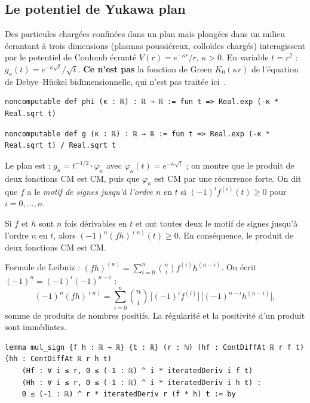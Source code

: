 \subsection{Le potentiel de Yukawa plan}\label{ch2:ssec:yuk}

\begin{physbox}
Des particules chargées confinées dans un plan mais plongées dans un milieu écrantant à trois dimensions (plasmas
poussiéreux, colloïdes chargés) interagissent par le potentiel de Coulomb écranté $V(r)=e^{-\kappa r}/r$, $\kappa>0$.
En variable $t=r^2$ : $g_\kappa(t)=e^{-\kappa\sqrt t}/\sqrt t$. \textbf{Ce n'est pas} la fonction de Green
$K_0(\kappa r)$ de l'équation de Debye--Hückel bidimensionnelle, qui n'est pas traitée ici~\cite{ch2yuk}.
\end{physbox}
\begin{leanbox}
\begin{lstlisting}[style=chdeux]
noncomputable def phi (κ : ℝ) : ℝ → ℝ := fun t => Real.exp (-κ * Real.sqrt t)
\end{lstlisting}
\begin{lstlisting}[style=chdeux]
noncomputable def g (κ : ℝ) : ℝ → ℝ := fun t => Real.exp (-κ * Real.sqrt t) / Real.sqrt t
\end{lstlisting}
\end{leanbox}

Le plan est : $g_\kappa=t^{-1/2}\cdot\varphi_\kappa$ avec $\varphi_\kappa(t)=e^{-\kappa\sqrt t}$ ; on montre que le
produit de deux fonctions CM est CM, puis que $\varphi_\kappa$ est CM par une récurrence forte. On dit que $f$ a le
\emph{motif de signes jusqu'à l'ordre $n$} en $t$ si $(-1)^if^{(i)}(t)\ge0$ pour $i=0,\dots,n$.

\begin{lemma}\label{ch2:lem:leibniz}
Si $f$ et $h$ sont $n$ fois dérivables en $t$ et ont toutes deux le motif de signes jusqu'à l'ordre $n$ en $t$, alors
$(-1)^n(fh)^{(n)}(t)\ge0$. En conséquence, le produit de deux fonctions CM est CM.
\end{lemma}
\begin{humanproof}
Formule de Leibniz : $(fh)^{(n)}=\sum_{i=0}^n\binom ni f^{(i)}h^{(n-i)}$. On écrit $(-1)^n=(-1)^i(-1)^{n-i}$ :
\[(-1)^n(fh)^{(n)}=\sum_{i=0}^n\binom ni\,\bigl[(-1)^if^{(i)}\bigr]\,\bigl[(-1)^{n-i}h^{(n-i)}\bigr],\]
somme de produits de nombres positifs. La régularité et la positivité d'un produit sont immédiates.
\end{humanproof}
\begin{leanbox}
\begin{lstlisting}[style=chdeux]
lemma mul_sign {f h : ℝ → ℝ} {t : ℝ} (r : ℕ) (hf : ContDiffAt ℝ r f t) (hh : ContDiffAt ℝ r h t)
    (Hf : ∀ i ≤ r, 0 ≤ (-1 : ℝ) ^ i * iteratedDeriv i f t)
    (Hh : ∀ i ≤ r, 0 ≤ (-1 : ℝ) ^ i * iteratedDeriv i h t) :
    0 ≤ (-1 : ℝ) ^ r * iteratedDeriv r (f * h) t := by
\end{lstlisting}
\end{leanbox}

